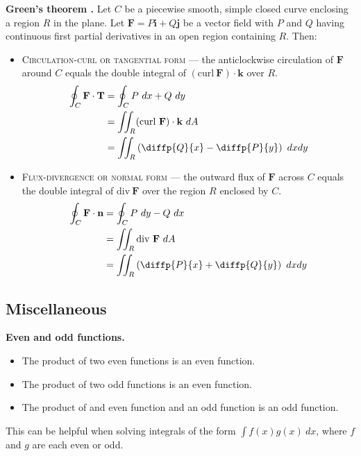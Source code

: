 \begin{shaded}
\textbf{Green's theorem \cite{thomas_calculus}.} Let $C$ be a piecewise smooth, simple closed curve enclosing a region $R$ in the
plane. Let $\mathbf{F} = P \mathbf{i} + Q \mathbf{j}$ be a vector field with $P$ and $Q$ having continuous first partial derivatives in an open region containing $R$. Then:
\begin{itemize}
	\item \textsc{Circulation-curl or tangential form} --- the anticlockwise circulation of $\mathbf{F}$ around $C$ equals the double integral of $(\text{curl} \ \mathbf{F}) \cdot \mathbf{k}$ over $R$.
\begin{align*}
\oint_C \mathbf{F} \cdot \mathbf{T} &= \oint_C P \ dx + Q \ dy \\
&= \iint_R (\text{curl} \ \mathbf{F}) \cdot \mathbf{k} \ dA \\
&= \iint_R \left( \diffp{Q}{x} - \diffp{P}{y} \right) \ dx dy
\end{align*}
	\item \textsc{Flux-divergence or normal form} --- the outward flux of $\mathbf{F}$ across $C$ equals the double integral of $\text{div} \ \mathbf{F}$ over the region $R$ enclosed by $C$.
\begin{align*}
\oint_C \mathbf{F} \cdot \mathbf{n} &= \oint_C P \ dy - Q \ dx \\
&= \iint_R \text{div} \ \mathbf{F} \ dA \\
&= \iint_R \left( \diffp{P}{x} + \diffp{Q}{y} \right) \ dx dy
\end{align*}
\end{itemize}
\end{shaded}

\subsection{Miscellaneous}

\begin{shaded}
\textbf{Even and odd functions.}
\begin{itemize}
	\item The product of two even functions is an even function.
	\item The product of two odd functions is an even function.
	\item The product of and even function and an odd function is an odd function.
\end{itemize}

This can be helpful when solving integrals of the form $\int f(x)g(x) \ dx$, where $f$ and $g$ are each even or odd.
\end{shaded}